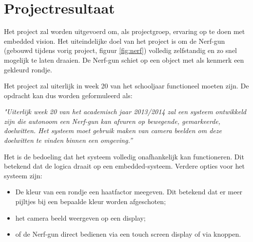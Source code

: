 \chapter{Projectresultaat}

Het project zal worden uitgevoerd om, als projectgroep, ervaring op te doen met
embedded vision. Het uiteindelijke doel van het project is om de Nerf-gun
(gebouwd tijdens vorig project, figuur \ref{fig:nerf}) volledig zelfstandig en
zo snel mogelijk te laten draaien. De Nerf-gun schiet op een object met als
kenmerk een gekleurd rondje.

Het project zal uiterlijk in week 20 van het schooljaar functioneel moeten
zijn. De opdracht kan dus worden geformuleerd als:

\emph{"Uiterlijk week 20 van het academisch jaar 2013/2014 zal een systeem
ontwikkeld zijn die autonoom een Nerf-gun kan afvuren op bewegende, gemarkeerde,
doelwitten. Het systeem moet gebruik maken van camera beelden om deze doelwitten
te vinden binnen een omgeving.”}

Het is de bedoeling dat het systeem volledig onafhankelijk kan functioneren.
Dit betekend dat de logica draait op een embedded-systeem. Verdere opties voor
het systeem zijn:

\begin{itemize}
    \item De kleur van een rondje een haatfactor meegeven. Dit betekend dat er
        meer pijltjes bij een bepaalde kleur worden afgeschoten;
    \item het camera beeld weergeven op een display;
    \item of de Nerf-gun direct bedienen via een touch screen display of via
        knoppen.
\end{itemize}
